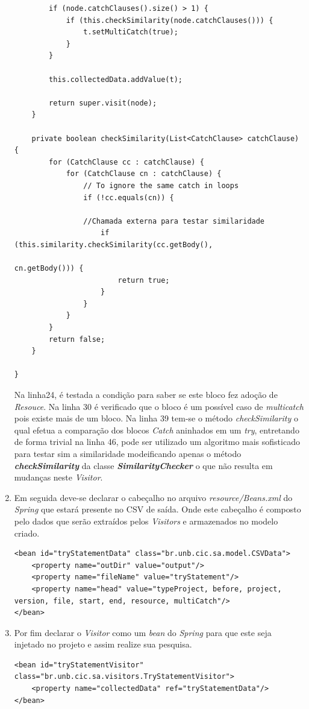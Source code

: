 \begin{enumerate}
\begin{lstlisting}
		if (node.catchClauses().size() > 1) {
			if (this.checkSimilarity(node.catchClauses())) {
				t.setMultiCatch(true);
			}
		}

		this.collectedData.addValue(t);

		return super.visit(node);
	}
	
	private boolean checkSimilarity(List<CatchClause> catchClause) {
		for (CatchClause cc : catchClause) {
			for (CatchClause cn : catchClause) {
				// To ignore the same catch in loops
				if (!cc.equals(cn)) {
				
				//Chamada externa para testar similaridade
					if (this.similarity.checkSimilarity(cc.getBody(),
														cn.getBody())) {
						return true;
					}
				}
			}
		}
		return false;
	}

}
			\end{lstlisting}
			
		 Na linha24, é testada a condição para saber se este bloco fez adoção de \textit{Resouce}. Na linha 30 é verificado que o bloco é um possível caso de \textit{multicatch} pois existe mais de um bloco. Na linha 39 tem-se o método \textit{checkSimilarity} o qual efetua a comparação dos blocos \textit{Catch} aninhados em um \textit{try}, entretando de forma trivial na linha 46, pode ser utilizado um algoritmo mais sofisticado para testar sim a similaridade modeificando apenas o método \textbf{\textit{checkSimilarity}} da classe \textit{\textbf{SimilarityChecker}} o que não resulta em mudanças neste \textit{Visitor}.
		
	
			\item Em seguida deve-se declarar o cabeçalho no arquivo \textit{resource/Beans.xml} do \textit{Spring} que estará presente no \acs{CSV} de saída. Onde este cabeçalho é composto pelo dados que serão extraídos pelos \textit{Visitors} e armazenados no modelo criado.
			
			\begin{lstlisting}
<bean id="tryStatementData" class="br.unb.cic.sa.model.CSVData">
	<property name="outDir" value="output"/>
	<property name="fileName" value="tryStatement"/>
	<property name="head" value="typeProject, before, project, version, file, start, end, resource, multiCatch"/> 
</bean>
			\end{lstlisting}
			
			
			\item Por fim declarar o \textit{Visitor} como um \textit{bean} do \textit{Spring} para que este seja injetado no projeto e assim realize sua pesquisa.
			
			\begin{lstlisting}
<bean id="tryStatementVisitor" class="br.unb.cic.sa.visitors.TryStatementVisitor">
	<property name="collectedData" ref="tryStatementData"/>
</bean>
			\end{lstlisting}
			
	\end{enumerate}




